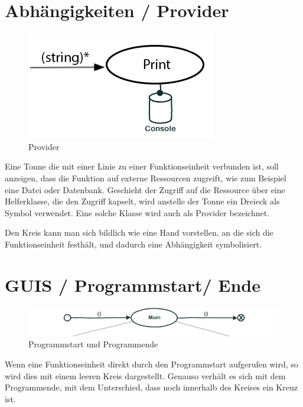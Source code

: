 \section{Abhängigkeiten / Provider}

\begin{figure}[H]
	\centering
		\includegraphics[width=.5\linewidth]{./img/diagramProvider.png}
	\caption{Provider}
\end{figure}



Eine Tonne die mit einer Linie zu einer Funktionseinheit verbunden ist, soll
anzeigen, dass die Funktion auf externe Ressourcen zugreift, wie zum
Beispiel eine Datei oder Datenbank. 
Geschieht der Zugriff auf die Ressource über eine Helferklasse, die den Zugriff
kapselt, wird anstelle der Tonne ein Dreieck als Symbol verwendet. Eine solche
Klasse wird auch als Provider bezeichnet. 

Den Kreis kann man sich bildlich wie eine Hand vorstellen, an die sich die
Funktionseinheit festhält, und dadurch eine Abhängigkeit symbolisiert.

\pagebreak

\section{GUIS / Programmstart/ Ende}

\begin{figure}[H]
	\centering
		\includegraphics[width=.9\linewidth]{./img/diagramStartEnd.png}
	\caption{Programmstart und Programmende}
\end{figure}




Wenn eine Funktionseinheit direkt durch den Programmstart aufgerufen wird, so
wird dies mit einem leeren Kreis dargestellt. Genauso verhält es sich mit dem
Programmende, mit dem Unterschied, dass noch innerhalb des Kreises ein Kreuz ist.

